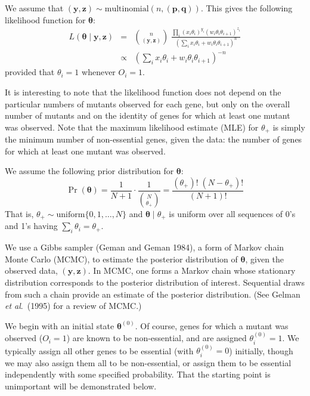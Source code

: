 \documentclass[letterpaper]{article}
\begin{document}
\begin{multicols}{2}
We assume that $(\boldsymbol{y},\boldsymbol{z}) \sim
\text{multinomial}(n, (\boldsymbol{p}, \boldsymbol{q}))$.
This gives the following likelihood function for $\boldsymbol{\theta}$:
\begin{eqnarray*}
L(\boldsymbol{\theta} \; | \; \boldsymbol{y}, \boldsymbol{z}) & = &
\binom{n}{(\boldsymbol{y},\boldsymbol{z})} \; \frac{\prod_i (x_i
\theta_i)^{y_i} (w_i \theta_i \theta_{i+1})^{z_i}}{(\sum_i x_i
\theta_i + w_i \theta_i \theta_{i+1})^n} \\
& \propto & \textstyle{(\sum_i x_i \theta_i + w_i \theta_i \theta_{i+1})^{-n}}
\end{eqnarray*}
provided that $\theta_i = 1$ whenever $O_i = 1$.

It is interesting to note that the likelihood function does not depend
on the particular numbers of mutants observed for each gene, but only
on the overall number of mutants and on the identity of genes for
which at least one mutant was observed.  Note that the maximum
likelihood estimate (MLE) for $\theta_+$ is simply the minimum number
of non-essential genes, given the data: the number of genes for which
at least one mutant was observed.

We assume the following prior distribution for $\boldsymbol{\theta}$:
$$\Pr(\boldsymbol{\theta}) = \frac{1}{N+1} \cdot
\frac{1}{\binom{N}{\theta_{+}}} = \frac{(\theta_+)! \; (N -
\theta_+)!}{(N+1)!}$$ That is, $\theta_+ \sim \text{uniform}\{0, 1,
\dots, N\}$ and $\boldsymbol{\theta} \; | \; \theta_+$ is uniform
over all sequences of 0's and 1's having $\sum_i \theta_i = \theta_+$.


We use a Gibbs sampler (Geman and Geman 1984), a form of Markov
chain Monte Carlo (MCMC), to estimate the posterior distribution of
$\boldsymbol{\theta}$, given the observed data, $(\boldsymbol{y},
\boldsymbol{z})$.  In MCMC, one forms a Markov chain whose stationary
distribution corresponds to the posterior distribution of interest.
Sequential draws from such a chain provide an estimate of the
posterior distribution.  (See Gelman \emph{et al}.\ (1995) for a review
of MCMC.)

We begin with an initial state $\boldsymbol{\theta}^{(0)}$.  Of
course, genes for which a mutant was observed ($O_i = 1$) are known to
be non-essential, and are assigned $\theta_i^{(0)} = 1$.  We typically
assign all other genes to be essential (with $\theta_i^{(0)} = 0$)
initially, though we may also assign them all to be non-essential, or
assign them to be essential independently with some specified
probability.  That the starting point is unimportant will be
demonstrated below.


\end{multicols}
\end{document}
